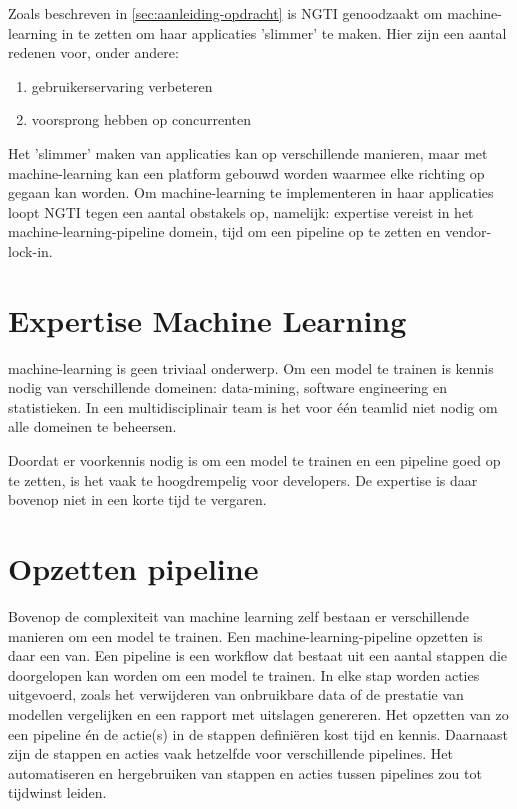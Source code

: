 
Zoals beschreven in \autoref{sec:aanleiding-opdracht} is NGTI genoodzaakt om \gls{machine-learning} in te zetten om haar applicaties 'slimmer' te maken. Hier zijn een aantal redenen voor, onder andere:
\begin{enumerate}
  \item gebruikerservaring verbeteren
  \item voorsprong hebben op concurrenten
\end{enumerate}

Het 'slimmer' maken van applicaties kan op verschillende manieren, maar met \gls{machine-learning} kan een platform gebouwd worden waarmee elke richting op gegaan kan worden. Om \gls{machine-learning} te implementeren in haar applicaties loopt NGTI tegen een aantal obstakels op, namelijk: expertise vereist in het \gls{machine-learning-pipeline} domein, tijd om een pipeline op te zetten en \gls{vendor-lock-in}.

\section{Expertise Machine Learning}\label{sec:expertise-machine-learning}
\Gls{machine-learning} is geen triviaal onderwerp. Om een model te trainen is kennis nodig van verschillende domeinen: \gls{data-mining}, software engineering en statistieken. In een multidisciplinair team is het voor één teamlid niet nodig om alle domeinen te beheersen.

Doordat er voorkennis nodig is om een model te trainen en een pipeline goed op te zetten, is het vaak te hoogdrempelig voor developers. De expertise is daar bovenop niet in een korte tijd te vergaren.

\section{Opzetten pipeline}\label{sec:opzetten-pipeline}
Bovenop de complexiteit van machine learning zelf bestaan er verschillende manieren om een model te trainen. Een \gls{machine-learning-pipeline} opzetten is daar een van. Een pipeline is een workflow dat bestaat uit een aantal stappen die doorgelopen kan worden om een model te trainen. In elke stap worden acties uitgevoerd, zoals het verwijderen van onbruikbare data of de prestatie van modellen vergelijken en een rapport met uitslagen genereren. Het opzetten van zo een pipeline én de actie(s) in de stappen definiëren kost tijd en kennis. Daarnaast zijn de stappen en acties vaak hetzelfde voor verschillende pipelines. Het automatiseren en hergebruiken van stappen en acties tussen pipelines zou tot tijdwinst leiden.

